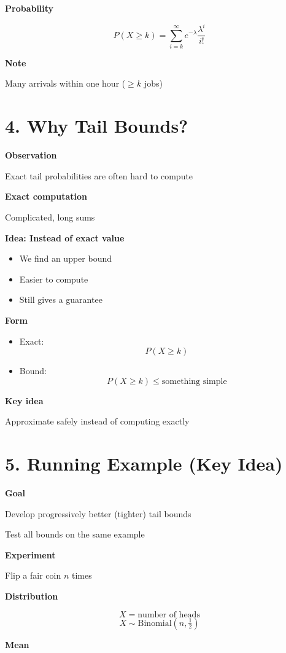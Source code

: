 \documentclass[11pt]{article}
\begin{document}
\textbf{Probability}

\[
P(X \geq k) = \sum_{i=k}^{\infty} e^{-\lambda} \frac{\lambda^i}{i!}
\]

\textbf{Note}

Many arrivals within one hour ($\geq k$ jobs)

\section*{4. Why Tail Bounds?}

\textbf{Observation}

Exact tail probabilities are often hard to compute

\textbf{Exact computation}

Complicated, long sums

\textbf{Idea: Instead of exact value}

\begin{itemize}
\item We find an upper bound
\item Easier to compute
\item Still gives a guarantee
\end{itemize}

\textbf{Form}

\begin{itemize}
\item Exact:
\[
P(X \geq k)
\]
\item Bound:
\[
P(X \geq k) \leq \text{something simple}
\]
\end{itemize}

\textbf{Key idea}

Approximate safely instead of computing exactly

\section*{5. Running Example (Key Idea)}

\textbf{Goal}

Develop progressively better (tighter) tail bounds

Test all bounds on the same example

\textbf{Experiment}

Flip a fair coin $n$ times

\textbf{Distribution}

\[
X = \text{number of heads}
\]
\[
X \sim \text{Binomial}(n, \tfrac{1}{2})
\]

\textbf{Mean}
\end{document}
